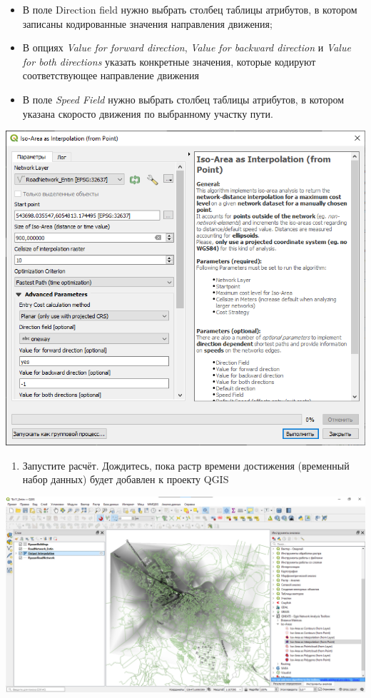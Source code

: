 \documentclass[
  12pt,
]{book}
\providecommand{\tightlist}{%
  \setlength{\itemsep}{0pt}\setlength{\parskip}{0pt}}
\begin{document}
\begin{itemize}
\tightlist
\item
  В поле Direction field нужно выбрать столбец таблицы атрибутов, в котором записаны кодированные значения направления движения;
\item
  В опциях \emph{Value for forward direction}, \emph{Value for backward direction} и \emph{Value for both directions} указать конкретные значения, которые кодируют соответствующее направление движения
\item
  В поле \emph{Speed Field} нужно выбрать столбец таблицы атрибутов, в котором указана скоросто движения по выбранному участку пути.
\end{itemize}

\includegraphics{images/Ex11_RoadNetwork/isoarea1.png}

\begin{enumerate}
\def\labelenumi{\arabic{enumi}.}
\setcounter{enumi}{5}
\tightlist
\item
  Запустите расчёт. Дождитесь, пока растр времени достижения (временный набор данных) будет добавлен к проекту QGIS
\end{enumerate}

\includegraphics{images/Ex11_RoadNetwork/isoarea2.png}
\end{document}
